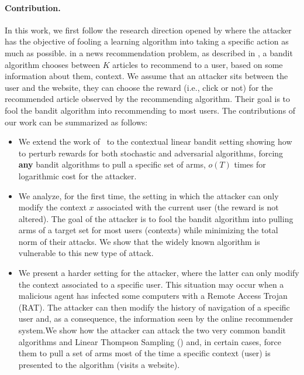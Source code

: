 \paragraph{Contribution.}In this work, we first follow the research direction opened by \cite{jun2018adversarial} where the attacker has the objective of fooling a learning algorithm into taking a specific action as much as possible.   in a news recommendation problem, as described in \cite{li2010contextual}, a bandit algorithm chooses between $K$ articles to recommend to a user, based on some information about them,  context. We assume that an attacker sits between the user and the website, they can choose the reward (i.e., click or not) for the recommended article observed by the recommending algorithm. Their goal is to fool the bandit algorithm into recommending   to most users. The contributions of our work can be summarized as follows:
\begin{itemize}
    \item We extend the work of~\cite{jun2018adversarial, liu2019data} to the contextual linear bandit setting showing how to perturb rewards for both stochastic and adversarial algorithms, forcing \textbf{any} bandit algorithms to pull a specific set of arms, $o(T)$ times for logarithmic cost for the attacker.
    \item We analyze, for the first time, the setting in which the attacker can only modify the context $x$ associated with the current user (the reward is not altered). The goal of the attacker is to fool the bandit algorithm into pulling arms of a target set for most users (\ie contexts) while minimizing the total norm of their attacks. We show that the widely known \linucb algorithm \cite{abbasi2011improved, lattimore2018bandit} is vulnerable to this new type of attack.
    \item We present a harder setting for the attacker, where the latter can only modify the context associated to a specific user. This situation may occur when a malicious agent has infected some computers with a Remote Access Trojan (RAT). The attacker can then modify the history of navigation of a specific user and, as a consequence, the information seen by the online recommender system.We show how the attacker can attack the two very common bandit algorithms \linucb and Linear Thompson Sampling (\lints) \cite{agrawal2013thompson,abeille2017linear} and, in certain cases, force them to pull a set of arms most of the time  a specific context (\ie user) is presented to the algorithm (\ie visits a website). 
\end{itemize}



